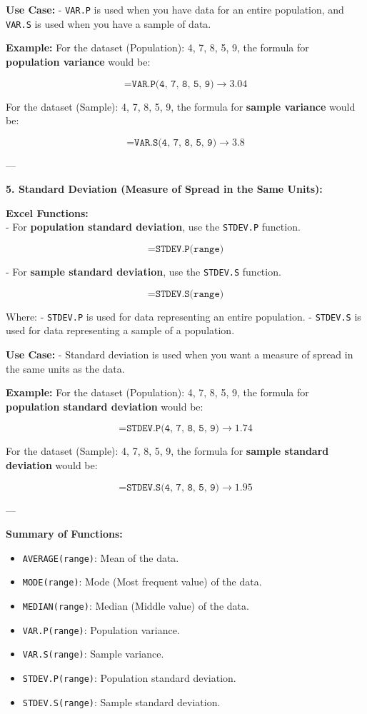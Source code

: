 \documentclass[12pt,a4paper]{book}
\begin{document}
\textbf{Use Case:}
- \texttt{VAR.P} is used when you have data for an entire population, and \texttt{VAR.S} is used when you have a sample of data.

\textbf{Example:}
For the dataset (Population): 4, 7, 8, 5, 9, the formula for \textbf{population variance} would be:

\[
\texttt{=VAR.P(4, 7, 8, 5, 9)} \rightarrow 3.04
\]

For the dataset (Sample): 4, 7, 8, 5, 9, the formula for \textbf{sample variance} would be:
 
\[
\texttt{=VAR.S(4, 7, 8, 5, 9)} \rightarrow 3.8
\]

---

\textbf{5. Standard Deviation (Measure of Spread in the Same Units):}

\vspace{0.5cm}

\textbf{Excel Functions:} \\
- For \textbf{population standard deviation}, use the \texttt{STDEV.P} function.
  
\[
\texttt{=STDEV.P(range)}
\]

- For \textbf{sample standard deviation}, use the \texttt{STDEV.S} function.

\[
\texttt{=STDEV.S(range)}
\]

Where:
- \texttt{STDEV.P} is used for data representing an entire population.
- \texttt{STDEV.S} is used for data representing a sample of a population.

\textbf{Use Case:}
- Standard deviation is used when you want a measure of spread in the same units as the data.

\textbf{Example:}
For the dataset (Population): 4, 7, 8, 5, 9, the formula for \textbf{population standard deviation} would be:

\[
\texttt{=STDEV.P(4, 7, 8, 5, 9)} \rightarrow 1.74
\]

For the dataset (Sample): 4, 7, 8, 5, 9, the formula for \textbf{sample standard deviation} would be:

\[
\texttt{=STDEV.S(4, 7, 8, 5, 9)} \rightarrow 1.95
\]

---

\textbf{Summary of Functions:}

\begin{itemize}
    \item \texttt{AVERAGE(range)}: Mean of the data.
    \item \texttt{MODE(range)}: Mode (Most frequent value) of the data.
    \item \texttt{MEDIAN(range)}: Median (Middle value) of the data.
    \item \texttt{VAR.P(range)}: Population variance.
    \item \texttt{VAR.S(range)}: Sample variance.
    \item \texttt{STDEV.P(range)}: Population standard deviation.
    \item \texttt{STDEV.S(range)}: Sample standard deviation.
\end{itemize}
\end{document}
